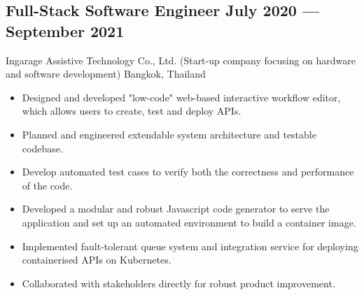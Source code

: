 \documentclass{article}
\newcommand{\subtext}[1]{
#1\par\vspace{-0.2cm}}
\newenvironment{zitemize}{
\begin{itemize}\itemsep0pt \parskip0pt \parsep1pt}
{\end{itemize}\vspace{-0.5cm}}
\begin{document}
        \vspace{0.2cm}
    
        \subsection*{Full-Stack Software Engineer \hfill July 2020 --- September 2021} 
        \subtext{Ingarage Assistive Technology Co., Ltd. {\scriptsize (Start-up company focusing on hardware and software development)} \hfill Bangkok, Thailand} 
            \vspace{0.1cm}
            \begin{zitemize}
                \item Designed and developed "low-code" web-based interactive workflow editor, which allows users to create, test and deploy APIs.
                \item Planned and engineered extendable system architecture and testable codebase.
                \item Develop automated test cases to verify both the correctness and performance of the code.
                \item Developed a modular and robust Javascript code generator to serve the application and set up an automated environment to build a container image.
                \item Implemented fault-tolerant queue system and integration service for deploying containerised APIs on Kubernetes.
                \item Collaborated with stakeholders directly for robust product improvement.
            \end{zitemize}

        \vspace{0.2cm}
    
\end{document}

